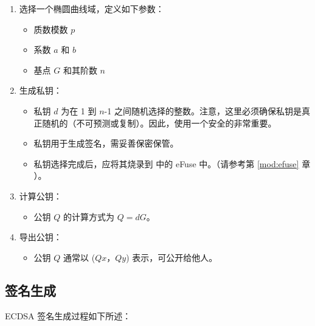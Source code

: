 \documentclass[main\_\_CN.tex]{subfiles}
\begin{document}
\begin{enumerate}
    \item 选择一个椭圆曲线域，定义如下参数：
    \begin{itemize}
        \item 质数模数 $p$
        \item 系数 $a$ 和 $b$
        \item 基点 $G$ 和其阶数 $n$
    \end{itemize}
    \item 生成私钥：
    \begin{itemize}
        \item 私钥 $d$ 为在 1 到 $n$-1 之间随机选择的整数。注意，这里必须确保私钥是真正随机的（不可预测或复制）。因此，使用一个安全的\textit{}非常重要。
        \item 私钥用于生成签名，需妥善保密保管。
        \item 私钥选择完成后，应将其烧录到 \chipname{} 中的 eFuse 中。（请参考第 \ref{mod:efuse} 章 \textit{}）。
    \end{itemize}
    \item 计算公钥：
    \begin{itemize}
        \item 公钥 $Q$ 的计算方式为 $Q = dG$。
    \end{itemize}
    \item 导出公钥：
    \begin{itemize}
        \item 公钥 $Q$ 通常以 ($Qx$，$Qy$) 表示，可公开给他人。
    \end{itemize}
\end{enumerate}

\subsection{签名生成}

ECDSA 签名生成过程如下所述：
\end{document}
